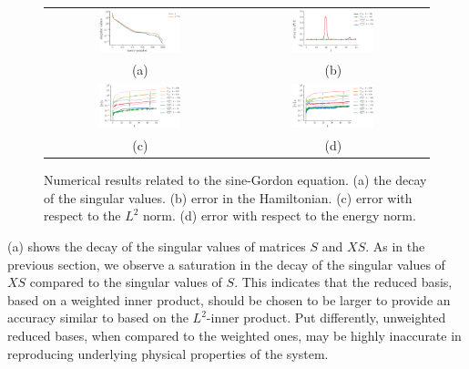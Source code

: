 \begin{figure} \label{fig:2}
\begin{tabular}{cc}
\includegraphics[width=0.45\textwidth]{./figs/sine/singulars} & \includegraphics[width=0.45\textwidth]{./figs/sine/energy} \\
(a) & (b) \\
\includegraphics[width=0.45\textwidth]{./figs/sine/l2} & \includegraphics[width=0.45\textwidth]{./figs/sine/energy_norm} \\
(c) & (d) \\
\end{tabular}
\caption{Numerical results related to the sine-Gordon equation. (a) the decay of the singular values. (b) error in the Hamiltonian. (c) error with respect to the $L^2$ norm. (d) error with respect to the energy norm.}
\end{figure}

(a) shows the decay of the singular values of matrices $S$ and $XS$. As in the previous section, we observe a saturation in the decay of the singular values of $XS$ compared to the singular values of $S$. This indicates that the reduced basis, based on a weighted inner product, should be chosen to be larger to provide an accuracy similar to based on the $L^2$-inner product. Put differently, unweighted reduced bases, when compared to the weighted ones, may be highly inaccurate in reproducing underlying physical properties of the system.

